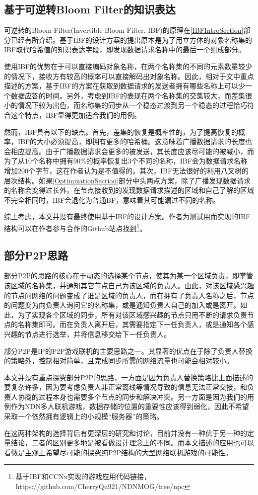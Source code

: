 \subsection*{基于可逆转Bloom Filter的知识表达}
\label{IBFComparisonSection}
\par
可逆转的Bloom Filter(Invertible Bloom Filter, IBF)的原理在\ref{IBFIntroSection}部分已经有所介绍。基于IBF的设计方案的提出原本是为了用立方体的对象名称集的IBF取代哈希值的知识表达字段，即发现数据请求名称中的最后一个组成部分。
\par
使用IBF的优势在于可以直接编码对象名称，在两个名称集的不同的元素数量较少的情况下，接收方有较高的概率可以直接解码出对象名称。因此，相对于文中重点描述的方案，基于IBF的方案在获取到数据请求的发送者拥有哪些名称上可以少一个数据应答的时间。另外，考虑到IBF的表现在两个名称集的交集较大，而差集很小的情况下较为出色，而名称集的同步从一个稳态过渡到另一个稳态的过程恰巧符合这个特点，IBF显得更加适合我们的用例。
\par
然而，IBF具有以下的缺点。首先，差集的恢复是概率性的，为了提高恢复的概率，IBF的大小必须提高，即拥有更多的哈希桶。这意味着广播数据请求的长度也会相应提高。由于广播数据请求会更多的被发送，其长度应该尽可能的被减小，而为了从10个名称中拥有90\%的概率恢复出3个不同的名称，IBF会为数据请求名称增加200个字节，这在作者认为是不值得的。其次，IBF无法很好的利用八叉树的层次结构。如果\ref{OptimizationSection}部分中头两点方案，除了广播发现数据请求的名称会变得过长外，在节点接收到的发现数据请求描述的区域和自己了解的区域不完全相同时，IBF会退化为普通BF，意味着其可能漏过不同的名称。
\par
综上考虑，本文并没有最终使用基于IBF的设计方案。作者为测试用而实现的IBF结构可以在作者参与合作的Github站点找到\footnote{基于IBF和CCNx实现的游戏应用代码链接，https://github.com/CherryQu921/NDNMOG/tree/npc}。
\subsection*{部分P2P思路}
\label{PartialP2PSection}
\par
部分P2P的思路的核心在于动态的选择某个节点，使其为某一个区域负责，即掌管该区域的名称集，并通知其它节点自己为该区域的负责人。由此，对该区域感兴趣的节点问网络的问题变成了谁是区域的负责人，而在拥有了负责人名称之后，节点的问题变为向负责人询问它的名称集，或是通知负责人自己的加入或是离开。如此，为了实现各个区域的同步，所有对该区域感兴趣的节点只用不断的请求负责节点的名称集即可。而在负责人离开后，其需要指定下一任负责人，或是通知各个感兴趣的节点进行选举，并将信息移交给下一任负责人。
\par
部分P2P是IP的P2P游戏联机的主要思路之一。其显著的优点在于除了负责人替换的策略外，控制相对简单，且完成同步所需的网络流量也可能会相对较小。
\par
本文并没有重点探究部分P2P的思路，一方面是因为负责人替换策略比上面描述的要复杂许多，因为要考虑负责人非正常离线等情况导致的信息无法正常交接，和负责人协商的过程本身也需要多个节点的同步和解决冲突。另一方面是因为我们的用例作为NDN多人联机游戏，数据存储的位置的重要性应该得到弱化，因此不希望采取一个依然拥有逻辑上的小规模“服务器”的策略。
\par
在这两种架构的选择背后有更深层的研究和讨论，目前并没有一种优于另一种的定量结论，二者的区别更多地是被看做设计理念上的不同。而本文描述的应用也可以看做是主观上希望尽可能的探究纯P2P结构的大型网络联机游戏的可能性。
